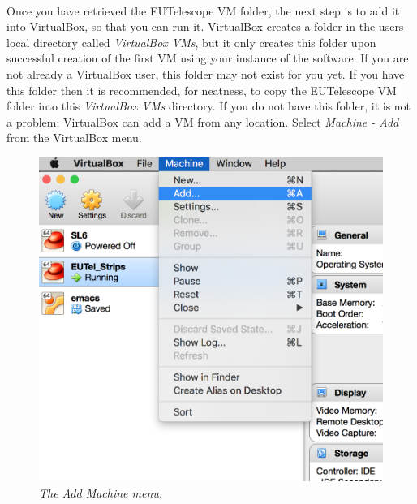 \documentclass[11pt]{article}
\begin{document}
\paragraph{}
Once you have retrieved the EUTelescope VM folder, the next step is to add it into VirtualBox, so that you can run it. VirtualBox creates a folder in the users local directory called \textit{VirtualBox VMs}, but it only creates this folder upon successful creation of the first VM using your instance of the software. If you are not already a VirtualBox user, this folder may not exist for you yet. If you have this folder then it is recommended, for neatness, to copy the EUTelescope VM folder into this \textit{VirtualBox VMs} directory. If you do not have this folder, it is not a problem; VirtualBox can add a VM from any location. Select \textit{Machine - Add} from the VirtualBox menu.
\begin{figure}[!ht]
	\centering
	\includegraphics[scale=0.3]{images/addmachine.png}
	\caption{\textit{The Add Machine menu.}}
\end{figure}
\end{document}
